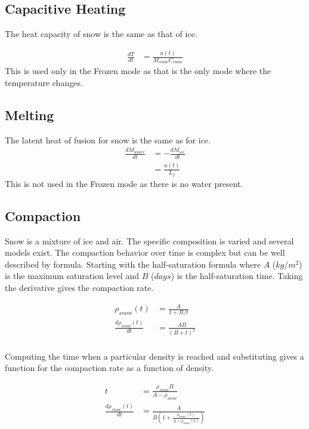 \documentclass{article}
\begin{document}
\subsection{Capacitive Heating}

The heat capacity of snow is the same as that of ice.

\begin{align}
\frac{dT}{dt} &= \frac{u(t)}{M_{snow} C_{snow}}
\end{align}
This is used only in the Frozen mode as that is
the only mode where the temperature changes.

\subsection{Melting}

The latent heat of fusion for snow is the same as for ice.
\begin{align}
\frac{dM_{water}}{dt} &= -\frac{dM_{ice}}{dt} \\
  &= \frac{u(t)}{L_f}
\end{align}
This is not used in the Frozen mode as there is no water present.

\subsection{Compaction}

Snow is a mixture of ice and air.
The specific composition is varied and several models exist.
The compaction behavior over time is complex but can
be well described by formula.
Starting with the half-saturation formula where $A$ ($kg/m^2$) is the
maximum saturation level and $B$ ($days$) is the
half-saturation time.
Taking the derivative gives the compaction rate.

\begin{align}
\rho_{snow}(t) &= \frac{A}{1 + B/t} \\
\frac{d\rho_{snow}(t)}{dt} &= \frac{A B}{(B + t)^2} \\
\end{align}

Computing the time when a particular density is reached and
substituting gives a function for the compaction rate
as a function of density.

\begin{align}
t &= \frac{\rho_{snow} B}{A - \rho_{snow}} \\
\frac{d\rho_{snow}(t)}{dt}
    &= \frac{A}{B (1 + \frac{\rho_{snow}(t)}{A - \rho_{snow}(t)}) }
\end{align}
\end{document}
